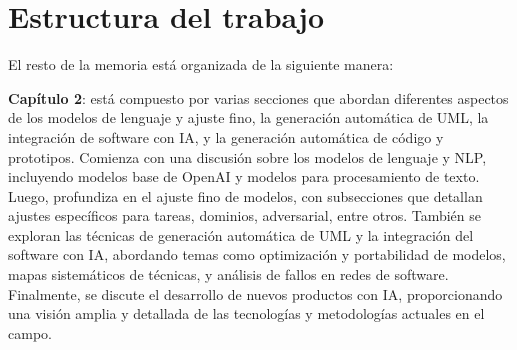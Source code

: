 \section{Estructura del trabajo}\label{section:estructura}

El resto de la memoria está organizada de la siguiente manera:

\textbf{Capítulo 2}: está compuesto por varias secciones que abordan diferentes aspectos de los modelos de lenguaje y ajuste fino, la generación automática de UML, la integración de software con IA, y la generación automática de código y prototipos. Comienza con una discusión sobre los modelos de lenguaje y NLP, incluyendo modelos base de OpenAI y modelos para procesamiento de texto. Luego, profundiza en el ajuste fino de modelos, con subsecciones que detallan ajustes específicos para tareas, dominios, adversarial, entre otros. También se exploran las técnicas de generación automática de UML y la integración del software con IA, abordando temas como optimización y portabilidad de modelos, mapas sistemáticos de técnicas, y análisis de fallos en redes de software. Finalmente, se discute el desarrollo de nuevos productos con IA, proporcionando una visión amplia y detallada de las tecnologías y metodologías actuales en el campo.
